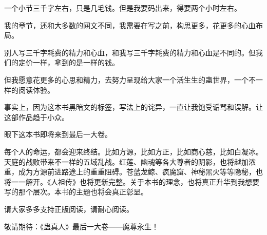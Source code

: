 \begin{this_body}
一个小节三千字左右，只是几毛钱。但是我要码出来，得要两个小时左右。

我的章节，还和大多数的网文不同，我需要在写之前，构思更多，花更多的心血布局。

别人写三千字耗费的精力和心血，和我写三千字耗费的精力和心血是不同的。但我们的定价一样，拿到的是一样的钱。

但我愿意花更多的心思和精力，去努力呈现给大家一个活生生的蛊世界，一个不一样的阅读体验。

事实上，因为这本书黑暗文的标签，写法上的诧异，一直让我饱受诟骂和误解。让这部作品趋于小众。

眼下这本书即将来到最后一大卷。

每个人的命运，都会迎来终结。比如方源，比如方正，比如商心慈，比如白凝冰。天庭的战败带来不一样的五域乱战。红莲、幽魂等各大尊者的阴影，也将越加浓重，成为方源前进路途上的重重阻碍。苍蓝龙鲸、疯魔窟、神秘黑火等等隐秘，也将一一解开。《人祖传》也将更新完整。关于本书的理念，也将真正升华到我想要写的那个层次。本书的主题也将会真正彰显。

请大家多多支持正版阅读，请耐心阅读。

敬请期待：《蛊真人》最后一大卷——魔尊永生！

\end{this_body}

